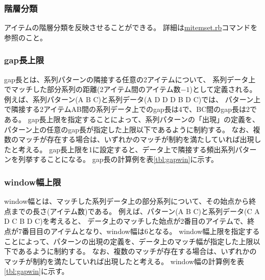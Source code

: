 \subsubsection*{階層分類}
アイテムの階層分類を反映させることができる。
詳細は\hyperref[sect:mitemset]{mitemset.rb}コマンドを参照のこと。

\subsubsection*{gap長上限}
gap長とは、系列パターンの隣接する任意の2アイテムについて、
系列データ上でマッチした部分系列の距離(2アイテム間のアイテム数$-1$)として定義される。
例えば、系列パターン(A B C)と系列データ(A D D D B D C)では、
パターン上で隣接する2アイテムAB間の系列データ上でのgap長は4で、BC間のgap長は2である。
gap長上限を指定することによって、系列パターンの「出現」の定義を、パターン上の任意のgap長が指定した上限以下であるように制約する。
なお、複数のマッチが存在する場合は、いずれかのマッチが制約を満たしていれば出現したと考える。
gap長上限を1に設定すると、データ上で隣接する頻出系列パターンを列挙することになる。
gap長の計算例を表\ref{tbl:gapwin}に示す。

\subsubsection*{window幅上限}
window幅とは、マッチした系列データ上の部分系列について、その始点から終点までの長さ(アイテム数)である。
例えば、パターン(A B C)と系列データ(C A D C B D C)を考えると、
データ上のマッチした始点が2番目のアイテムで、終点が7番目目のアイテムとなり、window幅は6となる。
window幅上限を指定することによって、パターンの出現の定義を、データ上のマッチ幅が指定した上限以下であるように制約する。
なお、複数のマッチが存在する場合は、いずれかのマッチが制約を満たしていれば出現したと考える。
window幅の計算例を表\ref{tbl:gapwin}に示す。

